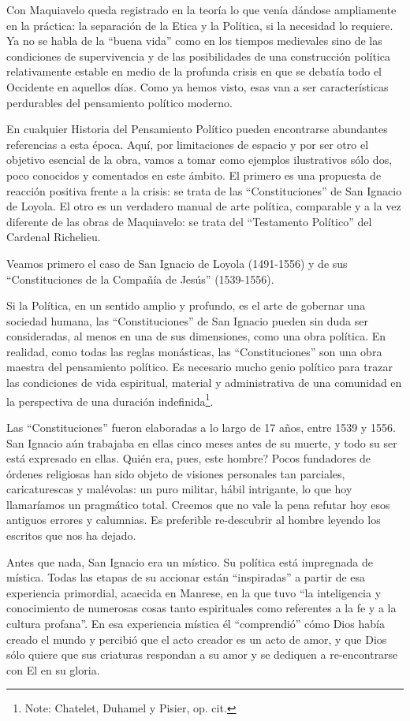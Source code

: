 \documentclass[
]{book}
\begin{document}
Con Maquiavelo queda registrado en la teoría lo que venía dándose ampliamente en la práctica: la separación de la Etica y la Política, si la necesidad lo requiere. Ya no se habla de la ``buena vida'' como en los tiempos medievales sino de las condiciones de supervivencia y de las posibilidades de una construcción política relativamente estable en medio de la profunda crisis en que se debatía todo el Occidente en aquellos días. Como ya hemos visto, esas van a ser características perdurables del pensamiento político moderno.

En cualquier Historia del Pensamiento Político pueden encontrarse abundantes referencias a esta época. Aquí, por limitaciones de espacio y por ser otro el objetivo esencial de la obra, vamos a tomar como ejemplos ilustrativos sólo dos, poco conocidos y comentados en este ámbito. El primero es una propuesta de reacción positiva frente a la crisis: se trata de las ``Constituciones'' de San Ignacio de Loyola. El otro es un verdadero manual de arte política, comparable y a la vez diferente de las obras de Maquiavelo: se trata del ``Testamento Político'' del Cardenal Richelieu.

Veamos primero el caso de San Ignacio de Loyola (1491-1556) y de sus ``Constituciones de la Compañía de Jesús'' (1539-1556).

Si la Política, en un sentido amplio y profundo, es el arte de gobernar una sociedad humana, las ``Constituciones'' de San Ignacio pueden sin duda ser consideradas, al menos en una de sus dimensiones, como una obra política. En realidad, como todas las reglas monásticas, las ``Constituciones'' son una obra maestra del pensamiento político. Es necesario mucho genio político para trazar las condiciones de vida espiritual, material y administrativa de una comunidad en la perspectiva de una duración indefinida\footnote{Note: Chatelet, Duhamel y Pisier, op. cit.}.

Las ``Constituciones'' fueron elaboradas a lo largo de 17 años, entre 1539 y 1556. San Ignacio aún trabajaba en ellas cinco meses antes de su muerte, y todo su ser está expresado en ellas. Quién era, pues, este hombre? Pocos fundadores de órdenes religiosas han sido objeto de visiones personales tan parciales, caricaturescas y malévolas: un puro militar, hábil intrigante, lo que hoy llamaríamos un pragmático total. Creemos que no vale la pena refutar hoy esos antiguos errores y calumnias. Es preferible re-descubrir al hombre leyendo los escritos que nos ha dejado.

Antes que nada, San Ignacio era un místico. Su política está impregnada de mística. Todas las etapas de su accionar están ``inspiradas'' a partir de esa experiencia primordial, acaecida en Manrese, en la que tuvo ``la inteligencia y conocimiento de numerosas cosas tanto espirituales como referentes a la fe y a la cultura profana''. En esa experiencia mística él ``comprendió'' cómo Dios había creado el mundo y percibió que el acto creador es un acto de amor, y que Dios sólo quiere que sus criaturas respondan a su amor y se dediquen a re-encontrarse con El en su gloria.
\end{document}
